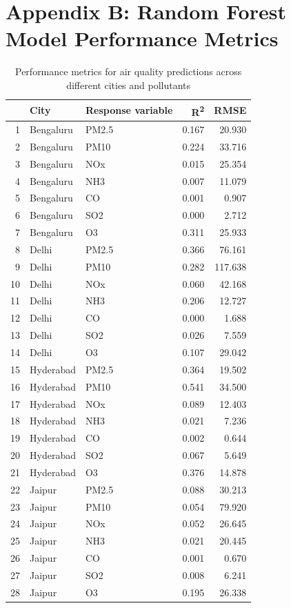 \documentclass[twoside,11pt]{article}
\begin{document}
\newpage


\section*{Appendix B: Random Forest Model Performance Metrics}
\begin{table}[ht]
  \centering
  \begin{tabular}{rllrr}
  \hline
  & City & Response variable & R\textsuperscript{2} & RMSE \\
  \hline
  1 & Bengaluru & PM2.5 & 0.167 & 20.930 \\
  2 & Bengaluru & PM10 & 0.224 & 33.716 \\
  3 & Bengaluru & NOx & 0.015 & 25.354 \\
  4 & Bengaluru & NH3 & 0.007 & 11.079 \\
  5 & Bengaluru & CO & 0.001 & 0.907 \\
  6 & Bengaluru & SO2 & 0.000 & 2.712 \\
  7 & Bengaluru & O3 & 0.311 & 25.933 \\
  8 & Delhi & PM2.5 & 0.366 & 76.161 \\
  9 & Delhi & PM10 & 0.282 & 117.638 \\
  10 & Delhi & NOx & 0.060 & 42.168 \\
  11 & Delhi & NH3 & 0.206 & 12.727 \\
  12 & Delhi & CO & 0.000 & 1.688 \\
  13 & Delhi & SO2 & 0.026 & 7.559 \\
  14 & Delhi & O3 & 0.107 & 29.042 \\
  15 & Hyderabad & PM2.5 & 0.364 & 19.502 \\
  16 & Hyderabad & PM10 & 0.541 & 34.500 \\
  17 & Hyderabad & NOx & 0.089 & 12.403 \\
  18 & Hyderabad & NH3 & 0.021 & 7.236 \\
  19 & Hyderabad & CO & 0.002 & 0.644 \\
  20 & Hyderabad & SO2 & 0.067 & 5.649 \\
  21 & Hyderabad & O3 & 0.376 & 14.878 \\
  22 & Jaipur & PM2.5 & 0.088 & 30.213 \\
  23 & Jaipur & PM10 & 0.054 & 79.920 \\
  24 & Jaipur & NOx & 0.052 & 26.645 \\
  25 & Jaipur & NH3 & 0.021 & 20.445 \\
  26 & Jaipur & CO & 0.001 & 0.670 \\
  27 & Jaipur & SO2 & 0.008 & 6.241 \\
  28 & Jaipur & O3 & 0.195 & 26.338 \\
  \hline
  \end{tabular}
  \caption{Performance metrics for air quality predictions across different cities and pollutants}
  \label{tab:air_quality_results}
  \end{table}
\end{document}
